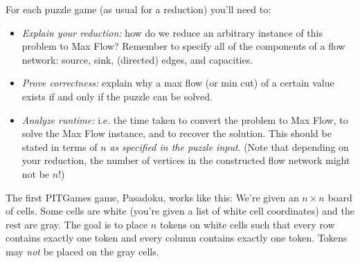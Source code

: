 \documentclass[12 pt, letterpaper]{hmcpset}
\begin{document}
For each puzzle game (as usual for a reduction) you'll need to:
\begin{itemize}
    \item \emph{Explain your reduction:} how do we reduce an arbitrary instance of this problem to Max Flow? Remember to specify all of the components of a flow network: source, sink, (directed) edges, and capacities.
    \item \emph{Prove correctness:} explain why a max flow (or min cut) of a certain value exists if and only if the puzzle can be solved.
    \item \emph{Analyze runtime:} i.e. the time taken to convert the problem to Max Flow, to solve the Max Flow instance, and to recover the solution. This should be stated in terms of $n$ \emph{as specified in the puzzle input}. (Note that depending on your reduction, the number of vertices in the constructed flow network might not be $n$!)
\end{itemize}

\begin{problem}
	The first PITGames game, Pasadoku, works like this:  We're given an $n \times n$ board of cells. Some cells are white (you're given a list of white cell coordinates) and the rest are gray. The goal is to place $n$ tokens on white cells such that every row contains exactly one token and every column contains exactly one token.  Tokens may \emph{not} be placed on the gray cells.
\end{problem}
\end{document}
